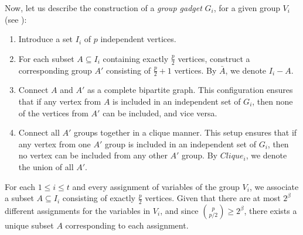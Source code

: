 

Now, let us describe the construction of a \textit{group gadget} $G_i$, for a given group $V_i$ (see ):

\begin{enumerate}
    \item Introduce a set $I_i$ of $p$ independent vertices.
    \item For each subset $A \subseteq I_i$ containing exactly $\frac{p}{2}$ vertices, construct a corresponding group $A'$ consisting of $\frac{p}{2} + 1$ vertices. By $\bar{A}$, we denote $I_i - A$.
    \item Connect $A$ and $A'$ as a complete bipartite graph. This configuration ensures that if any vertex from $A$ is included in an independent set of $G_i$, then none of the vertices from $A'$ can be included, and vice versa.
    \item Connect all $A'$ groups together in a clique manner. This setup ensures that if any vertex from one $A'$ group is included in an independent set of $G_i$, then no vertex can be included from any other $A'$ group. By $Clique_i$, we denote the union of all $A'$.
\end{enumerate}

\medskip

For each $1 \leq i \leq t$ and every assignment of variables of the group $V_i$, we associate a subset $A \subseteq I_i$ consisting of exactly $\frac{p}{2}$ vertices. Given that there are at most $2^\beta$ different assignments for the variables in $V_i$, and since $\binom{p}{p/2} \geq 2^\beta$, there exists a unique subset $A$ corresponding to each assignment.

\medskip


